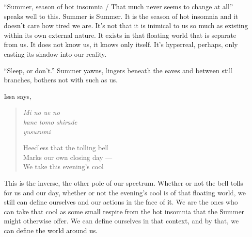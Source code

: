 \documentclass[12pt]{memoir}
\begin{document}
``Summer, season of hot insomnia / That much never seems to change at all'' speaks well to this. Summer is Summer. It is the season of hot insomnia and it doesn't care how tired we are. It's not that it is inimical to us so much as existing within its own external nature. It exists in that floating world that is separate from us. It does not know us, it knows only itself. It's hyperreal, perhaps, only casting its shadow into our reality.\begin{comment}\footnote{It was briefly hinted by its partner that Dwale's death may have been an overdose --- or at least a drug-induced accident --- due to a heroic dose of DXM. I don't know if this is true, and the tweet where she suggested this has since been deleted. Hell, I don't even know if I was meant to see that information. Still, it sticks in the mind. On mentioning my own explorations into mushrooms as a way to set aside, for a few weeks, the obstinate burden of depression, Dwale readily agreed that this would probably be good for me. It seemed knowledgeable, as though it knew that smear of other reality (or hyperreality) well enough.\par If this story of its death \emph{is} the case, then that makes me wonder just what those last hours, last minutes, last seconds might have contained. Was it filled with pleasure? Did it, as a Muslim, feel closer to Allah? Did it know what it had done, panic, and try to retreat? Terror hems these thoughts in.}\end{comment}

``Sleep, or don't.'' Summer yawns, lingers beneath the eaves and between still branches, bothers not with such as us.

Issa says,

\begin{verse}
\begin{multicols}{2}
\emph{Mi no ue no} \\
\emph{kane tomo shirade} \\
\emph{yusuzumi} 

\columnbreak

Heedless that the tolling bell \\
Marks our own closing day --- \\
We take this evening's cool
\end{multicols}
\vspace{-1em}
\parencite[39]{issa}
\end{verse}

This is the inverse, the other pole of our spectrum. Whether or not the bell tolls for us and our day, whether or not the evening's cool is of that floating world, we still can define ourselves and our actions in the face of it. We are the ones who can take that cool as some small respite from the hot insomnia that the Summer might otherwise offer. We can define ourselves in that context, and by that, we can define the world around us.
\end{document}
